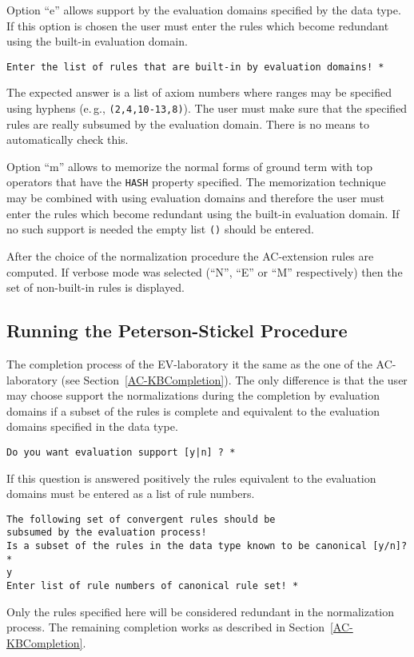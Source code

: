 Option ``e'' allows support by the evaluation domains specified by the data
type.
If this option is chosen the user must enter the rules which become redundant
using the built-in evaluation domain.
\begin{verbatim}
Enter the list of rules that are built-in by evaluation domains! *
\end{verbatim}
The expected answer is a list of axiom numbers where ranges may be
specified using hyphens
(e.\,g., \texttt{(2,4,10-13,8)}).
The user must make sure that the specified rules are really subsumed by the
evaluation domain.
There is no means to automatically check this.

Option ``m'' allows to memorize the normal forms of ground term with top
operators that have the \texttt{HASH} property specified.
The memorization technique may be combined with using evaluation domains
and therefore  the user must enter the rules which become redundant
using the built-in evaluation domain. 
If no such support is needed the empty list \texttt{()} should be entered.

After the choice of the normalization procedure the AC-extension rules 
are computed.
If verbose mode was selected (``N'', ``E'' or ``M'' respectively)
then the set of non-built-in rules is displayed.

\subsection{Running the Peterson-Stickel Procedure}
\label{se:evC}

The completion process of the EV-laboratory it the same as the one of the 
AC-laboratory (see Section~\ref{AC-KBCompletion}).
The only difference is that the user may choose support the normalizations
during the completion by evaluation domains if a subset of the rules
is complete and equivalent to the evaluation domains specified in the
data type.
\begin{verbatim}
Do you want evaluation support [y|n] ? *
\end{verbatim}
If this question is answered positively the rules equivalent to the evaluation
domains must be entered as a list of rule numbers.
\begin{verbatim}
The following set of convergent rules should be
subsumed by the evaluation process!
Is a subset of the rules in the data type known to be canonical [y/n]?  *
y
Enter list of rule numbers of canonical rule set! *
\end{verbatim}
Only the rules specified here will be considered redundant in the normalization
process.
The remaining completion works as described in Section~\ref{AC-KBCompletion}.